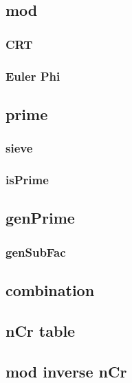 \subsection{mod}
\subsubsection{CRT}


\subsubsection{Euler Phi}


\subsection{prime}
\subsubsection{sieve}


\subsubsection{isPrime}


\subsection{genPrime}


\subsubsection{genSubFac}


\subsection{combination}

\subsection{nCr table}


\subsection{mod inverse nCr}


